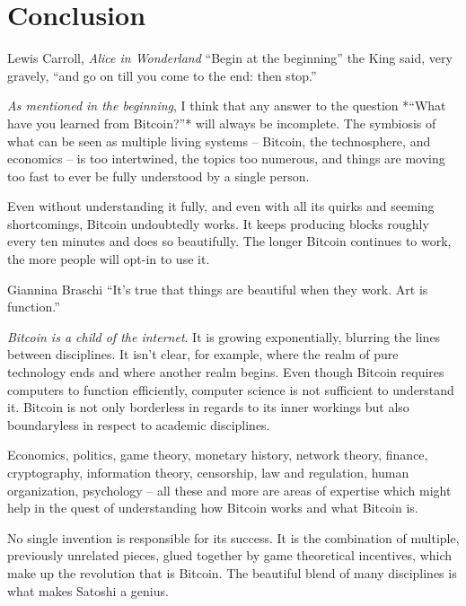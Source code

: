 \chapter{Conclusion}
\label{ch:conclusion}

\begin{chapquote}{Lewis Carroll, \textit{Alice in Wonderland}}
``Begin at the beginning'' the King said, very gravely, ``and go on till you
come to the end: then stop.''
\end{chapquote}

\textit{As mentioned in the beginning}, I think that any answer to the
question *“What have you learned from Bitcoin?”* will always be incomplete. The
symbiosis of what can be seen as multiple living systems -- Bitcoin, the
technosphere, and economics -- is too intertwined, the topics too numerous, and
things are moving too fast to ever be fully understood by a single person.

Even without understanding it fully, and even with all its quirks and seeming
shortcomings, Bitcoin undoubtedly works. It keeps producing blocks roughly every
ten minutes and does so beautifully. The longer Bitcoin continues to work, the
more people will opt-in to use it.

\begin{chapquote}{Giannina Braschi}
``It's true that things are beautiful when they work. Art is function.''
\end{chapquote}

\textit{Bitcoin is a child of the internet}. It is growing exponentially,
blurring the lines between disciplines. It isn’t clear, for example, where the
realm of pure technology ends and where another realm begins. Even though
Bitcoin requires computers to function efficiently, computer science is not
sufficient to understand it. Bitcoin is not only borderless in regards to its
inner workings but also boundaryless in respect to academic disciplines.

Economics, politics, game theory, monetary history, network theory, finance,
cryptography, information theory, censorship, law and regulation, human
organization, psychology -- all these and more are areas of expertise which might
help in the quest of understanding how Bitcoin works and what Bitcoin is.

No single invention is responsible for its success. It is the combination of
multiple, previously unrelated pieces, glued together by game theoretical
incentives, which make up the revolution that is Bitcoin. The beautiful blend of
many disciplines is what makes Satoshi a genius.

